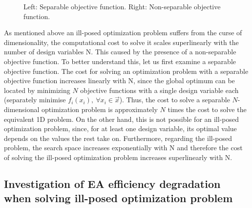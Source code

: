 \begin{figure}[h!]
\begin{minipage}[b]{1\linewidth}
 \centering
\end{minipage}
\caption{Left: Separable objective function. Right: Non-separable objective function.} 
\label{nonsep}
\end{figure}

As mentioned above an ill-posed optimization problem suffers from the curse of dimensionality, the computational cost to solve it scales superlinearly with the number of design variables N. This caused by the presence of a non-separable objective function. To better understand this, let us first examine a separable objective function. The cost for solving an optimization problem with a separable objective function increases linearly with N, since the global optimum can be located by minimizing $N$ objective functions with a single design variable each (separately minimise $f_i(x_i),~ \forall x_i \in \vec{x}$). Thus, the cost to solve a separable $N$-dimensional optimization problem is approximately $N$ times the cost to solve the equivalent 1D problem. On the other hand, this is not possible for an ill-posed optimization problem, since, for at least one design variable, its optimal value depends on the values the rest take on. Furthermore, regarding the ill-posed problem, the search space increases exponentially with N and therefore the cost of solving the ill-posed optimization problem increases superlinearly with N.   
 
\subsection{Investigation of EA efficiency degradation when solving ill-posed optimization problem}
\label{Inv2}

